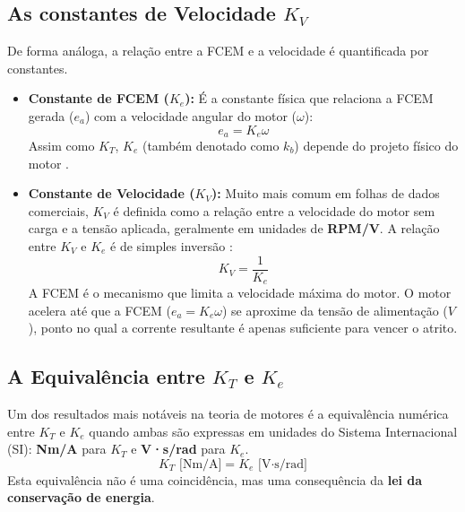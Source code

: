 \documentclass[12pt, a4paper, openright, oneside, brazilian]{abntex2}
\begin{document}
\subsection{\texorpdfstring{As constantes de Velocidade $K_V$}{As constantes de Velocidade KV}}
\label{KV}

De forma análoga, a relação entre a FCEM e a velocidade é quantificada por constantes.
\begin{itemize}
    \item \textbf{Constante de FCEM ($K_e$):} É a constante física que relaciona a FCEM gerada ($e_a$) com a velocidade angular do motor ($\omega$):
    \begin{equation}
        e_a = K_e \omega
    \end{equation}
    Assim como $K_T$, $K_e$ (também denotado como $k_b$) depende do projeto físico do motor \parencite{zoltan2012understanding}.

    \item \textbf{Constante de Velocidade ($K_V$):} Muito mais comum em folhas de dados comerciais, $K_V$ é definida como a relação entre a velocidade do motor sem carga e a tensão aplicada, geralmente em unidades de \textbf{RPM/V}. A relação entre $K_V$ e $K_e$ é de simples inversão \parencite{infineon2011bldc}:
    \begin{equation}
        K_V = \frac{1}{K_e}
    \end{equation}
    A FCEM é o mecanismo que limita a velocidade máxima do motor. O motor acelera até que a FCEM ($e_a = K_e \omega$) se aproxime da tensão de alimentação ($V$), ponto no qual a corrente resultante é apenas suficiente para vencer o atrito.
\end{itemize}

\subsection{A Equivalência entre $K_T$ e $K_e$}

Um dos resultados mais notáveis na teoria de motores é a equivalência numérica entre $K_T$ e $K_e$ quando ambas são expressas em unidades do Sistema Internacional (SI): \textbf{Nm/A} para $K_T$ e \textbf{V·s/rad} para $K_e$.
\begin{equation}
    K_T \text{ [Nm/A]} = K_e \text{ [V·s/rad]}
\end{equation}
Esta equivalência não é uma coincidência, mas uma consequência da \textbf{lei da conservação de energia}.
\end{document}
